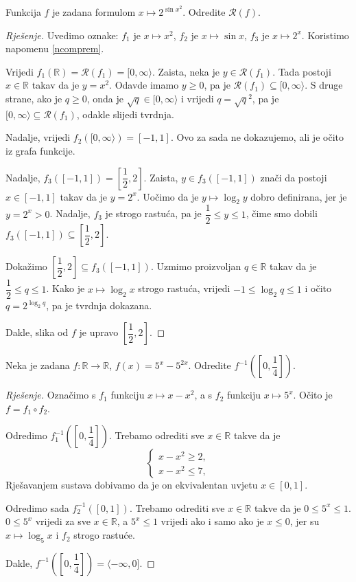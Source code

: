 \begin{exercise}
\label{excompim1}
Funkcija $f$ je zadana formulom $x\mapsto 2^{\sin{x^2}}$. Odredite $\mathcal{R}(f)$.
\end{exercise}
\begin{proof}[Rješenje]
Uvedimo oznake: $f_1$ je $x\mapsto x^2$, $f_2$ je $x\mapsto \sin{x}$, $f_3$ je $x\mapsto 2^x$. Koristimo napomenu \ref{ncomprem}. 

Vrijedi $f_1(\mathbb{R})=\mathcal{R}(f_1)=[0, \infty\rangle$. Zaista, neka je $y\in \mathcal{R}(f_1)$. Tada postoji $x\in \mathbb{R}$ takav da je $y=x^2$. Odavde imamo $y\geq 0$, pa je $\mathcal{R}(f_1)\subseteq [0, \infty\rangle$. S druge strane, ako je $q\geq 0$, onda je $\sqrt{q}\in [0, \infty\rangle$ i vrijedi $q=\sqrt{q}^2$, pa je $[0, \infty\rangle\subseteq \mathcal{R}(f_1)$, odakle slijedi tvrdnja.

Nadalje, vrijedi $f_2\left([0, \infty\rangle\right)=[-1, 1]$. Ovo za sada ne dokazujemo, ali je očito iz grafa funkcije. 

Nadalje, $f_3\left([-1, 1]\right)=\left[\dfrac{1}{2}, 2\right]$. Zaista, $y\in f_3\left([-1, 1]\right)$ znači da postoji $x\in [-1, 1]$ takav da je $y=2^x$. Uočimo da je $y\mapsto \log_2{y}$ dobro definirana, jer je $y=2^x>0$. Nadalje, $f_3$ je strogo rastuća, pa je $\dfrac{1}{2}\leq y\leq 1$, čime smo dobili $f_3\left([-1, 1]\right)\subseteq \left[\dfrac{1}{2}, 2\right]$. 

Dokažimo $\left[\dfrac{1}{2}, 2\right]\subseteq f_3\left([-1, 1]\right)$. Uzmimo proizvoljan $q\in \mathbb{R}$ takav da je $\dfrac{1}{2}\leq q\leq 1$. Kako je $x\mapsto \log_2{x}$ strogo rastuća, vrijedi $-1\leq \log_2{q}\leq 1$ i očito $q=2^{\log_2{q}}$, pa je tvrdnja dokazana.

Dakle, slika od $f$ je upravo $\left[\dfrac{1}{2}, 2\right]$.
\end{proof}
\begin{exercise}
Neka je zadana $f : \mathbb{R}\to \mathbb{R}$, $f(x)=5^x-5^{2x}$. Odredite $f^{-1}\left(\left[0, \dfrac{1}{4}\right]\right)$.
\end{exercise}
\begin{proof}[Rješenje]
Označimo s $f_1$ funkciju $x\mapsto x-x^2$, a s $f_2$ funkciju $x\mapsto 5^x$. Očito je $f=f_1\circ f_2$.

Odredimo $f_1^{-1}\left(\left[0, \dfrac{1}{4}\right]\right)$. Trebamo odrediti sve $x\in \mathbb{R}$ takve da je
$$\begin{cases}
x-x^2\geq 2,\\
x-x^2\leq 7,
\end{cases}$$
Rješavanjem sustava dobivamo da je on ekvivalentan uvjetu $x\in [0, 1]$.

Odredimo sada $f_2^{-1}\left([0, 1]\right)$. Trebamo odrediti sve $x\in \mathbb{R}$ takve da je $0\leq 5^x\leq 1$. $0\leq 5^x$ vrijedi za sve $x\in \mathbb{R}$, a $5^x\leq 1$ vrijedi ako i samo ako je $x\leq 0$, jer su $x\mapsto \log_5{x}$ i $f_2$ strogo rastuće. 

Dakle, $f^{-1}\left(\left[0, \dfrac{1}{4}\right]\right)=\langle-\infty, 0]$.
\end{proof}

